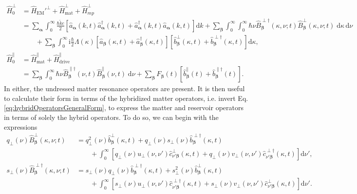 \documentclass{article}
\begin{document}
\begin{equation}
\begin{split}
\hat{H}_0^\perp &= \hat{H}_\mathrm{EM}'^\perp + \hat{H}_\mathrm{mat}^\perp + \hat{H}_{mp}^\perp\\
&= \sum_{\bm{\alpha}}\int_0^\infty\frac{\hbar\tilde{k}c}{2}\left[\hat{a}_{\bm{\alpha}}(k,t)\hat{a}_{\bm{\alpha}}^\dagger(k,t) + \hat{a}_{\bm{\alpha}}^\dagger(k,t)\hat{a}_{\bm{\alpha}}(k,t)\right]\mathrm{d}k + \sum_{\bm{\beta}}\int_0^\infty\int_0^\infty\hbar\nu\hat{B}_{\bm{\beta}}^{\perp\dagger}(\kappa,\nu;t)\hat{B}_{\bm{\beta}}^\perp(\kappa,\nu;t)\;\mathrm{d}\kappa\,\mathrm{d}\nu\\
&\qquad + \sum_{\bm{\beta}}\int_0^\infty\mathrm{i}\frac{\hbar}{2}\Lambda(\kappa)\left[\hat{a}_{\bm{\beta}}(\kappa,t) + \hat{a}_{\bm{\beta}}^\dagger(\kappa,t)\right]\left[\hat{b}_{\bm{\beta}}^\perp(\kappa,t) + \hat{b}_{\bm{\beta}}^{\perp\dagger}(\kappa,t)\right]\mathrm{d}\kappa,\\[1.0em]
\hat{H}_0^\parallel &= \hat{H}_\mathrm{mat}^\parallel + \hat{H}_\mathrm{drive}^\parallel\\
&= \sum_{\bm{\beta}}\int_0^\infty\hbar\nu\hat{B}_{\bm{\beta}}^{\parallel\dagger}(\nu,t)\hat{B}_{\bm{\beta}}^\parallel(\nu,t)\;\mathrm{d}\nu + \sum_{\bm{\beta}}F_{\bm{\beta}}(t)\left[\hat{b}_{\bm{\beta}}^\parallel(t) + \hat{b}_{\bm{\beta}}^{\parallel\dagger}(t)\right].
\end{split}
\end{equation}
In either, the undressed matter resonance operators are present. It is then useful to calculate their form in terms of the hybridized matter operators, i.e. invert Eq. \eqref{eq:hybridOperatorsGeneralForm}, to express the matter and reservoir operators in terms of solely the hybrid operators. To do so, we can begin with the expressions
\begin{equation}
\begin{split}
q_\perp(\nu)\hat{B}_{\bm{\beta}}^\perp(\kappa,\nu;t) &= q_\perp^2(\nu)\hat{b}_{\bm{\beta}}^\perp(\kappa,t) + q_\perp(\nu)s_\perp(\nu)\hat{b}_{\bm{\beta}}^{\perp\dagger}(\kappa,t)\\
&\qquad + \int_0^\infty\left[q_\perp(\nu)u_\perp(\nu,\nu')\hat{c}_{\nu'\bm{\beta}}^\perp(\kappa,t) + q_\perp(\nu)v_\perp(\nu,\nu')\hat{c}_{\nu'\bm{\beta}}^{\perp\dagger}(\kappa,t)\right]\mathrm{d}\nu',\\[0.5em]
s_\perp(\nu)\hat{B}_{\bm{\beta}}^{\perp\dagger}(\kappa,\nu;t) &= s_\perp(\nu)q_\perp(\nu)\hat{b}_{\bm{\beta}}^{\perp\dagger}(\kappa,t) + s_\perp^2(\nu)\hat{b}_{\bm{\beta}}^{\perp}(\kappa,t)\\
&\qquad + \int_0^\infty\left[s_\perp(\nu)u_\perp(\nu,\nu')\hat{c}_{\nu'\bm{\beta}}^{\perp\dagger}(\kappa,t) + s_\perp(\nu)v_\perp(\nu,\nu')\hat{c}_{\nu'\bm{\beta}}^{\perp}(\kappa,t)\right]\mathrm{d}\nu'.
\end{split}
\end{equation}
\end{document}

